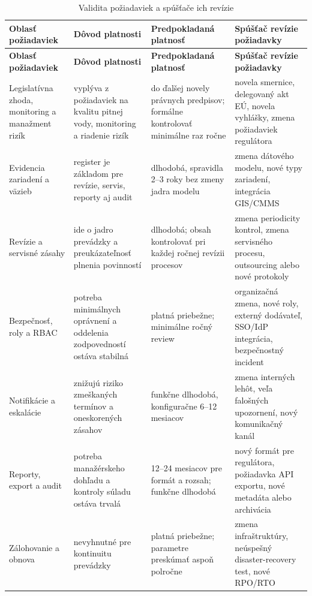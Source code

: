\footnotesize
\begin{longtable}{|p{3.3cm}|p{4.2cm}|p{3.8cm}|p{3.2cm}|}
\caption{Validita požiadaviek a spúšťače ich revízie}\label{tab:requirements-validity}\\
\hline
\textbf{Oblasť požiadaviek} & \textbf{Dôvod platnosti} & \textbf{Predpokladaná platnosť} & \textbf{Spúšťač revízie požiadavky} \\
\hline
\endfirsthead
\hline
\textbf{Oblasť požiadaviek} & \textbf{Dôvod platnosti} & \textbf{Predpokladaná platnosť} & \textbf{Spúšťač revízie požiadavky} \\
\hline
\endhead
Legislatívna zhoda, monitoring a manažment rizík & vyplýva z požiadaviek na kvalitu pitnej vody, monitoring a riadenie rizík & do ďalšej novely právnych predpisov; formálne kontrolovať minimálne raz ročne & novela smernice, delegovaný akt EÚ, novela vyhlášky, zmena požiadaviek regulátora \\
\hline
Evidencia zariadení a väzieb & register je základom pre revízie, servis, reporty aj audit & dlhodobá, spravidla 2--3 roky bez zmeny jadra modelu & zmena dátového modelu, nové typy zariadení, integrácia GIS/CMMS \\
\hline
Revízie a servisné zásahy & ide o jadro prevádzky a preukázateľnosť plnenia povinností & dlhodobá; obsah kontrolovať pri každej ročnej revízii procesov & zmena periodicity kontrol, zmena servisného procesu, outsourcing alebo nové protokoly \\
\hline
Bezpečnosť, roly a RBAC & potreba minimálnych oprávnení a oddelenia zodpovedností ostáva stabilná & platná priebežne; minimálne ročný review & organizačná zmena, nové roly, externý dodávateľ, SSO/IdP integrácia, bezpečnostný incident \\
\hline
Notifikácie a eskalácie & znižujú riziko zmeškaných termínov a oneskorených zásahov & funkčne dlhodobá, konfiguračne 6--12 mesiacov & zmena interných lehôt, veľa falošných upozornení, nový komunikačný kanál \\
\hline
Reporty, export a audit & potreba manažérskeho dohľadu a kontroly súladu ostáva trvalá & 12--24 mesiacov pre formát a rozsah; funkčne dlhodobá & nový formát pre regulátora, požiadavka API exportu, nové metadáta alebo archivácia \\
\hline
Zálohovanie a obnova & nevyhnutné pre kontinuitu prevádzky & platná priebežne; parametre preskúmať aspoň polročne & zmena infraštruktúry, neúspešný disaster-recovery test, nové RPO/RTO \\
\hline
\end{longtable}
\normalsize

